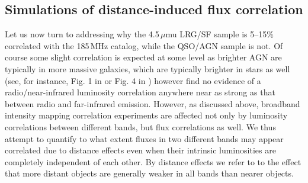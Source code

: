 \documentclass{emulateapj}
\begin{document}
\subsection{Simulations of distance-induced flux correlation}

Let us now turn to addressing why the 4.5\,$\mu$mu LRG/SF sample is 5--15\% correlated with the 185\,MHz catalog, while the QSO/AGN sample is not. Of course some slight correlation is expected at some level as brighter AGN are typically in more massive galaxies, which are typically brighter in stars as well (see, for instance, Fig. 1 in \citep{seymour07} or Fig. 4 in \citep{Willott03}) however \citet{mauch07} find no evidence of a radio/near-infrared luminosity correlation anywhere near as strong as that between radio and far-infrared emission.  However, as discussed above, broadband intensity mapping correlation experiments are affected not only by luminosity correlations between different bands, but flux correlations as well. We thus attempt to quantify to what extent fluxes in two different bands may appear correlated due to distance effects even when their intrinsic luminosities are completely independent of each other. By distance effects we refer to to the effect that more distant objects are generally weaker in all bands than nearer objects. 
\end{document}
